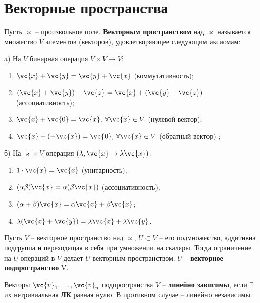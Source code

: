 \section{Векторные пространства}

\begin{to_def}
	Пусть $\varkappa$ -- произвольное поле. \textbf{Векторным пространством} над $\varkappa$ называется множество $V$ элементов (векторов), удовлетворяющее следующим аксиомам:

	\noindent
	a) На $V$ бинарная операция $V \times V \rightarrow V$:
	\begin{enumerate}[label = \Roman*.]
		\item $\vc{x} + \vc{y} = \vc{y} + \vc{x}$ (коммутативность);
		\item $(\vc{x} + \vc{y}) + \vc{z} = \vc{x} + (\vc{y} + \vc{z})$ (ассоциативность);
		\item $\vc{x} + \vc{0} = \vc{x}, \, \forall \vc{x}\in V$ (нулевой вектор);
		\item $\vc{x} + (-\vc{x}) = \vc{0}, \, \forall \vc{x} \in V$ (обратный вектор) ;
	\end{enumerate}
	б) На $\varkappa \times V$ операция $(\lambda, \vc{x} \rightarrow \lambda \vc{x})$:
	\begin{enumerate}[label = \Roman*., start = 5]
		\item $1 \cdot \vc{x} = \vc{x}$ (унитарность);
		\item $(\alpha \beta) \vc{x} = \alpha  (\beta \vc{x})$ (ассоциативность);
		\item $(\alpha + \beta) \vc{x} = \alpha \vc{x} + \beta \vc{x}$;
		\item $\lambda (\vc{x} +\vc{y}) = \lambda \vc{x} + \lambda \vc{y}$.
	\end{enumerate}
\end{to_def}

\begin{to_def}
	Пусть $V$ -- векторное пространство над $\varkappa$, $U \subset V$ -- его подмножество, аддитивна подгруппа и переходящая в себя при умножении на скаляры. Тогда ограничение на $U$ операций в $V$ делает $U$ векторным пространством. $U$ -- \textbf{векторное подпространство} V.
\end{to_def}

\begin{to_def}
	Векторы $\vc{v}_1, \ldots, \vc{v}_n$ подпространства $V$ -- \textbf{линейно зависимы}, если $\exists$ их нетривиальная \textbf{ЛК} равная нулю. В противном случае -- линейно независимы.
\end{to_def}

